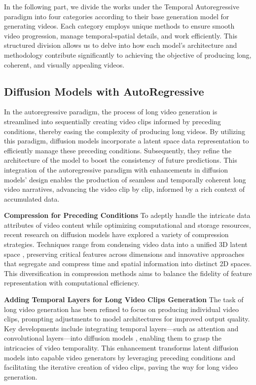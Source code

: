 \documentclass{article}
\begin{document}
In the following part, we divide the works under the Temporal Autoregressive paradigm into four categories according to their base generation model for generating videos. Each category employs unique methods to ensure smooth video progression, manage temporal-spatial details, and work efficiently. This structured division allows us to delve into how each model's architecture and methodology contribute significantly to achieving the objective of producing long, coherent, and visually appealing videos.
\subsection{Diffusion Models with AutoRegressive}
In the autoregressive paradigm, the process of long video generation is streamlined into sequentially creating video clips informed by preceding conditions, thereby easing the complexity of producing long videos. By utilizing this paradigm, diffusion models incorporate a latent space data representation to efficiently manage these preceding conditions. Subsequently, they refine the architecture of the model to boost the consistency of future predictions. This integration of the autoregressive paradigm with enhancements in diffusion models' design enables the production of seamless and temporally coherent long video narratives, advancing the video clip by clip, informed by a rich context of accumulated data.


\noindent\textbf{Compression for Preceding Conditions}
To adeptly handle the intricate data attributes of video content while optimizing computational and storage resources, recent research on diffusion models have explored a variety of compression strategies. Techniques range from condensing video data into a unified 3D latent space \citep{pixeldance,VidRD}, preserving critical features across dimensions and innovative approaches that \cite{PVDM} segregate and compress time and spatial information into distinct 2D spaces. This diversification in compression methods aims to balance the fidelity of feature representation with computational efficiency.


\noindent\textbf{Adding Temporal Layers for Long Video Clips Generation} 
The task of long video generation has been refined to focus on producing individual video clips, prompting adjustments to model architectures for improved output quality. Key developments include integrating temporal layers—such as attention and convolutional layers—into diffusion models \citep{align,VidRD}, enabling them to grasp the intricacies of video temporality. This enhancement transforms latent diffusion models into capable video generators by leveraging preceding conditions and facilitating the iterative creation of video clips, paving the way for long video generation.
\end{document}
